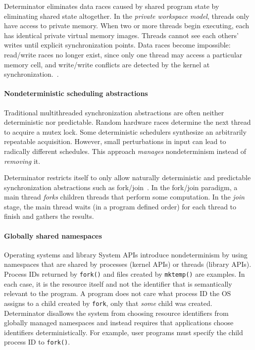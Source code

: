 Determinator eliminates data races caused by shared program state by eliminating
shared state altogether. In the \emph{private workspace model}, threads only
have access to private memory. When two or more threads begin executing, each
has identical private virtual memory images. Threads cannot see each others'
writes until explicit synchronization points. Data races become impossible:
read/write races no longer exist, since only one thread may access a particular
memory cell, and write/write conflicts are detected by the kernel at
synchronization.~\cite{Aviram10}. 

\paragraph{Nondeterministic scheduling abstractions}
Traditional multithreaded synchronization abstractions are often neither
deterministic nor predictable. Random hardware races determine the next thread
to acquire a mutex lock. Some deterministic schedulers synthesize an arbitrarily
repeatable acquisition. However, small
perturbations in input can lead to radically different schedules. This approach
\emph{manages} nondeterminism instead of \emph{removing} it.

Determinator restricts itself to only allow naturally deterministic and
predictable synchronization abstractions such as
fork/join~\cite{nelson1988approximate}. In the fork/join paradigm, a main thread
\emph{forks} children threads that perform some computation. In the \emph{join}
stage, the main thread waits (in a program defined order) for each thread to
finish and gathers the results.

\paragraph{Globally shared namespaces}
Operating systems and library
System APIs introduce nondeterminism by using namespaces that are shared by
processes (kernel APIs) or threads (library APIs). Process IDs returned by
{\tt fork()} and files created by {\tt mktemp()} are examples. In each case,
it is the resource itself and not the identifier that is semantically relevant
to the program. A program does not care what process ID the OS assigns to a
child created by {\tt fork}, only that \emph{some} child was created.
Determinator disallows the system from choosing resource identifiers
from globally managed namespaces and instead requires that applications
choose identifiers deterministically. For example, user programs must specify
the child process ID to {\tt fork()}.
\\

